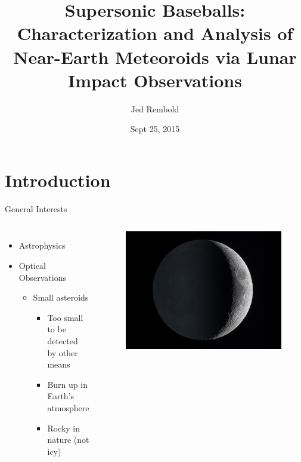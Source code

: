 \documentclass[pdf]{beamer}
\title[Supersonic Baseballs]{Supersonic Baseballs: Characterization and Analysis of Near-Earth Meteoroids via Lunar Impact Observations}
\subtitle{}
\author{Jed Rembold\inst{1}}
\institute{
  \inst{1}
  Willamette University\\
  Salem, OR
}
\date{Sept 25, 2015}
\begin{document}
\frame{\titlepage}


\section{Introduction}

\begin{frame}{General Interests}
  \begin{columns}
	\begin{itemize}
	  \item Astrophysics
	  \item Optical Observations
		\begin{itemize}
		  \item Small asteroids
			\begin{itemize}
			  \item Too small to be detected by other means
			  \item Burn up in Earth's atmosphere
			  \item Rocky in nature (not icy)
			\end{itemize}
		\end{itemize}
	\end{itemize}
	\begin{figure}[h!]
	  \centering
	  \includegraphics[width=\textwidth]{Images/EarthShine.jpg}
	\end{figure}
  \end{columns}
\end{frame}
\end{document}
